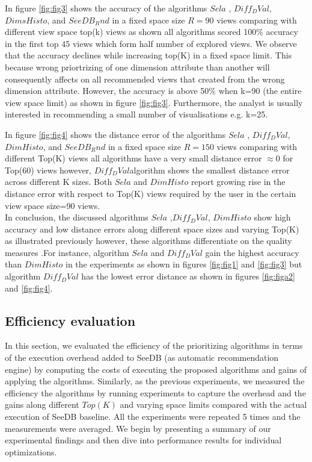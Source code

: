 In figure \ref{fig:fig3} shows the accuracy of the 
algorithms $Sela$ , $Diff_DVal$, $DimsHisto$, and $SeeDB_Rnd$ in a fixed space size $R=90$ views
 comparing with different view 
space top(k) views as shown all algorithms scored 100\% accuracy in the first top 45 views 
which form half number of explored views.
We observe that the accuracy declines 
while increasing top(K) in a fixed space limit. 
This because wrong priortrizing of one dimension attribute than another will consequently affects on all 
recommended views that created from the wrong dimension attribute. However, the accuracy is above
50\% when k=90 (the entire view space limit) as shown in figure \ref{fig:fig3}. 
Furthermore, the analyst is usually interested in recommending a small number of 
visualisations e.g. k=25. 

In figure \ref{fig:fig4} shows the distance error  of the 
algorithms $Sela$ , $Diff_DVal$, $DimHisto$, and $SeeDB_Rnd$ in a fixed space size $R=150$ views
 comparing with different Top(K) views 
 all algorithms have a very small distance error $\approx 0$ for Top(60) views
 however, $Diff_DVal$algorithm 
shows the smallest distance error across different K sizes. Both $Sela$  and $DimHisto$ 
report growing rise in the distance error with respect to Top(K) views required 
by the user in the certain view space size=90 views.\\

 In conclusion, the discussed algorithms $Sela$ ,$Diff_DVal$, $DimHisto$ show high 
 accuracy and low distance errors along different space sizes and 
 varying Top(K) as  illustrated previously however,
  these algorithms differentiate on the quality measures .For instance, 
 algorithm $Sela$ and $Diff_DVal$ 
 gain the highest accuracy than $DimHisto$ in the experiments as shown in
 figures  \ref{fig:fig1} and \ref{fig:fig3} but algorithm $Diff_DVal$  has the lowest error distance as shown in figures  \ref{fig:figa2} and \ref{fig:fig4}. 
 \subsection{Efficiency evaluation}
  In this section, we evaluated the efficiency of the prioritizing algorithms in terms of the execution overhead added to 
	SeeDB (as automatic recommendation engine) by computing the costs of executing the proposed algorithms and gains of applying 
	the algorithms. Similarly, as the previous experiments, we measured the efficiency the algorithms 
	by running experiments to capture the overhead and the gains 
	along different $Top(K)$ and varying space limits compared with the actual execution of SeeDB baseline. 
 All the experiments were repeated 5 times and the measurements were averaged. We begin by presenting a summary of our experimental
findings and then dive into performance results for individual optimizations.

